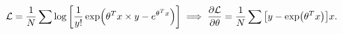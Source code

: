 \begin{answer}
	\[
		\begin{aligned}
			\mathcal{L}
			=
			\frac{1}{N}\sum\log\qty[\frac{1}{y!}\exp(\theta^Tx\times y-e^{\theta^Tx})]
			\implies
			\pdv{\mathcal{L}}{\theta}
			=
			\frac{1}{N}\sum\qty[y-\exp(\theta^Tx)]x
		\end{aligned}
	.\]
\end{answer}
